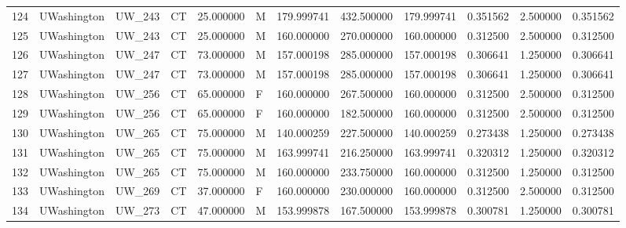\begin{tabular}{llllrlrrrrrr}
124    &     UWashington &       UW\_243 &                 CT &  25.000000 &        M &       179.999741 &    432.500000 &  179.999741 &               0.351562 &            2.500000 &          0.351562 \\
125    &     UWashington &       UW\_243 &                 CT &  25.000000 &        M &       160.000000 &    270.000000 &  160.000000 &               0.312500 &            2.500000 &          0.312500 \\
126    &     UWashington &       UW\_247 &                 CT &  73.000000 &        M &       157.000198 &    285.000000 &  157.000198 &               0.306641 &            1.250000 &          0.306641 \\
127    &     UWashington &       UW\_247 &                 CT &  73.000000 &        M &       157.000198 &    285.000000 &  157.000198 &               0.306641 &            1.250000 &          0.306641 \\
128    &     UWashington &       UW\_256 &                 CT &  65.000000 &        F &       160.000000 &    267.500000 &  160.000000 &               0.312500 &            2.500000 &          0.312500 \\
129    &     UWashington &       UW\_256 &                 CT &  65.000000 &        F &       160.000000 &    182.500000 &  160.000000 &               0.312500 &            2.500000 &          0.312500 \\
130    &     UWashington &       UW\_265 &                 CT &  75.000000 &        M &       140.000259 &    227.500000 &  140.000259 &               0.273438 &            1.250000 &          0.273438 \\
131    &     UWashington &       UW\_265 &                 CT &  75.000000 &        M &       163.999741 &    216.250000 &  163.999741 &               0.320312 &            1.250000 &          0.320312 \\
132    &     UWashington &       UW\_265 &                 CT &  75.000000 &        M &       160.000000 &    233.750000 &  160.000000 &               0.312500 &            1.250000 &          0.312500 \\
133    &     UWashington &       UW\_269 &                 CT &  37.000000 &        F &       160.000000 &    230.000000 &  160.000000 &               0.312500 &            2.500000 &          0.312500 \\
134    &     UWashington &       UW\_273 &                 CT &  47.000000 &        M &       153.999878 &    167.500000 &  153.999878 &               0.300781 &            1.250000 &          0.300781 \\

\end{tabular}

